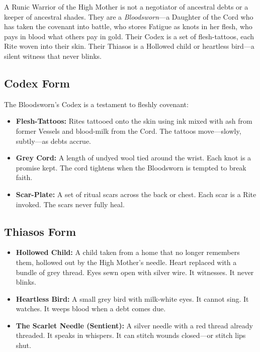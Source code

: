 A Runic Warrior of the High Mother is not a negotiator of ancestral debts or a keeper of ancestral shades. They are a \textit{Bloodsworn}—a Daughter of the Cord who has taken the covenant into battle, who stores Fatigue as knots in her flesh, who pays in blood what others pay in gold. Their Codex is a set of flesh-tattoos, each Rite woven into their skin. Their Thiasos is a Hollowed child or heartless bird—a silent witness that never blinks.

\subsection{Codex Form}

The Bloodsworn's Codex is a testament to fleshly covenant:

\begin{itemize}
\item \textbf{Flesh-Tattoos:} Rites tattooed onto the skin using ink mixed with ash from former Vessels and blood-milk from the Cord. The tattoos move—slowly, subtly—as debts accrue.
\item \textbf{Grey Cord:} A length of undyed wool tied around the wrist. Each knot is a promise kept. The cord tightens when the Bloodsworn is tempted to break faith.
\item \textbf{Scar-Plate:} A set of ritual scars across the back or chest. Each scar is a Rite invoked. The scars never fully heal.
\end{itemize}

\subsection{Thiasos Form}

\begin{itemize}
\item \textbf{Hollowed Child:} A child taken from a home that no longer remembers them, hollowed out by the High Mother's needle. Heart replaced with a bundle of grey thread. Eyes sewn open with silver wire. It witnesses. It never blinks.
\item \textbf{Heartless Bird:} A small grey bird with milk-white eyes. It cannot sing. It watches. It weeps blood when a debt comes due.
\item \textbf{The Scarlet Needle (Sentient):} A silver needle with a red thread already threaded. It speaks in whispers. It can stitch wounds closed—or stitch lips shut.
\end{itemize}

